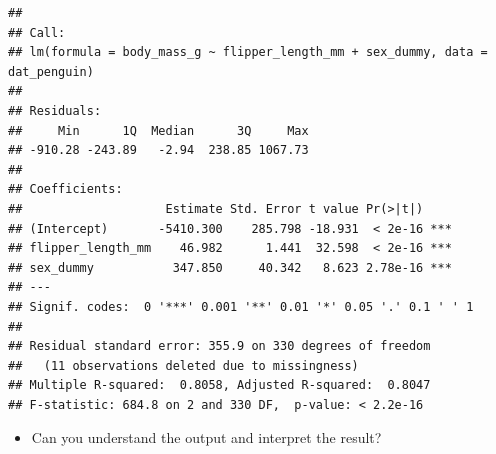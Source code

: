 \documentclass[
]{book}
\providecommand{\tightlist}{%
  \setlength{\itemsep}{0pt}\setlength{\parskip}{0pt}}
\begin{document}
\begin{verbatim}
## 
## Call:
## lm(formula = body_mass_g ~ flipper_length_mm + sex_dummy, data = dat_penguin)
## 
## Residuals:
##     Min      1Q  Median      3Q     Max 
## -910.28 -243.89   -2.94  238.85 1067.73 
## 
## Coefficients:
##                    Estimate Std. Error t value Pr(>|t|)    
## (Intercept)       -5410.300    285.798 -18.931  < 2e-16 ***
## flipper_length_mm    46.982      1.441  32.598  < 2e-16 ***
## sex_dummy           347.850     40.342   8.623 2.78e-16 ***
## ---
## Signif. codes:  0 '***' 0.001 '**' 0.01 '*' 0.05 '.' 0.1 ' ' 1
## 
## Residual standard error: 355.9 on 330 degrees of freedom
##   (11 observations deleted due to missingness)
## Multiple R-squared:  0.8058, Adjusted R-squared:  0.8047 
## F-statistic: 684.8 on 2 and 330 DF,  p-value: < 2.2e-16
\end{verbatim}

\begin{itemize}
\tightlist
\item
  Can you understand the output and interpret the result?
\end{itemize}

  
\end{document}
